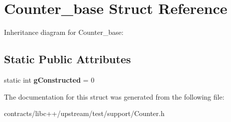 \hypertarget{struct_counter__base}{}\section{Counter\+\_\+base Struct Reference}
\label{struct_counter__base}


Inheritance diagram for Counter\+\_\+base\+:
\subsection*{Static Public Attributes}
\begin{DoxyCompactItemize}
\item 
\mbox{\label{struct_counter__base_a87ee88e54107019c100e987348c97ba4}} 
static int {\bfseries g\+Constructed} = 0
\end{DoxyCompactItemize}


The documentation for this struct was generated from the following file\+:\begin{DoxyCompactItemize}
\item 
contracts/libc++/upstream/test/support/Counter.\+h\end{DoxyCompactItemize}
